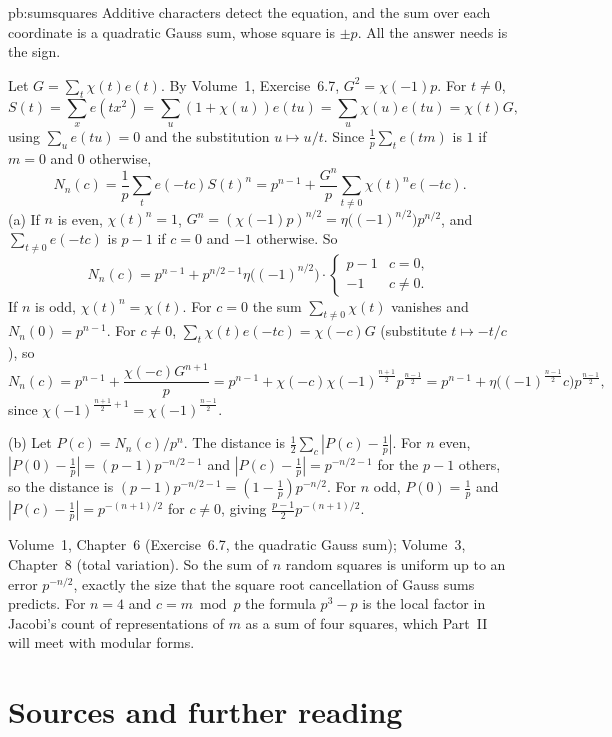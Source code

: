 \begin{solution}{pb:sumsquares}
\idea Additive characters detect the equation, and the sum over each coordinate is a quadratic Gauss sum, whose square is
$\pm p$. All the answer needs is the sign.

\writeup Let $G=\sum_t\chi(t)e(t)$. By Volume~1, Exercise~6.7, $G^2=\chi(-1)p$. For $t\ne0$,
\[
S(t)=\sum_xe(tx^2)=\sum_u(1+\chi(u))e(tu)=\sum_u\chi(u)e(tu)=\chi(t)G,
\]
using $\sum_ue(tu)=0$ and the substitution $u\mapsto u/t$. Since $\frac1p\sum_te(tm)$ is $1$ if $m=0$ and $0$ otherwise,
\[
N_n(c)=\frac1p\sum_{t}e(-tc)S(t)^n=p^{n-1}+\frac{G^n}p\sum_{t\ne0}\chi(t)^ne(-tc).
\]
(a) If $n$ is even, $\chi(t)^n=1$, $G^n=(\chi(-1)p)^{n/2}=\eta\bigl((-1)^{n/2}\bigr)p^{n/2}$, and $\sum_{t\ne0}e(-tc)$ is $p-1$ if
$c=0$ and $-1$ otherwise. So
\[
N_n(c)=p^{n-1}+p^{n/2-1}\eta\bigl((-1)^{n/2}\bigr)\cdot\begin{cases}p-1&c=0,\\-1&c\ne0.\end{cases}
\]
If $n$ is odd, $\chi(t)^n=\chi(t)$. For $c=0$ the sum $\sum_{t\ne0}\chi(t)$ vanishes and $N_n(0)=p^{n-1}$. For $c\ne0$,
$\sum_t\chi(t)e(-tc)=\chi(-c)G$ (substitute $t\mapsto-t/c$), so
\[
N_n(c)=p^{n-1}+\frac{\chi(-c)G^{n+1}}p=p^{n-1}+\chi(-c)\chi(-1)^{\frac{n+1}2}p^{\frac{n-1}2}=p^{n-1}+\eta\bigl((-1)^{\frac{n-1}2}c\bigr)p^{\frac{n-1}2},
\]
since $\chi(-1)^{\frac{n+1}2+1}=\chi(-1)^{\frac{n-1}2}$.

(b) Let $P(c)=N_n(c)/p^n$. The distance is $\frac12\sum_c|P(c)-\frac1p|$. For $n$ even, $|P(0)-\frac1p|=(p-1)p^{-n/2-1}$ and
$|P(c)-\frac1p|=p^{-n/2-1}$ for the $p-1$ others, so the distance is $(p-1)p^{-n/2-1}=(1-\frac1p)p^{-n/2}$. For $n$ odd,
$P(0)=\frac1p$ and $|P(c)-\frac1p|=p^{-(n+1)/2}$ for $c\ne0$, giving $\frac{p-1}2p^{-(n+1)/2}$.

\tools Volume~1, Chapter~6 (Exercise~6.7, the quadratic Gauss sum); Volume~3, Chapter~8 (total variation).
\leads So the sum of $n$ random squares is uniform up to an error $p^{-n/2}$, exactly the size that the square root
cancellation of Gauss sums predicts. For $n=4$ and $c=m\bmod p$ the formula $p^3-p$ is the local factor in Jacobi's count of
representations of $m$ as a sum of four squares, which Part~II will meet with modular forms.
\end{solution}

\section*{Sources and further reading}

